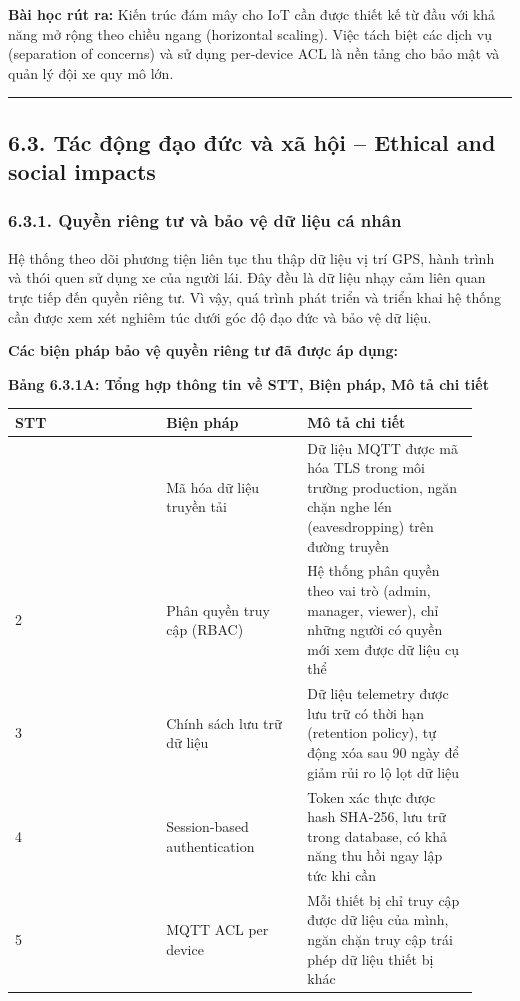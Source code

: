 \documentclass[13pt,a4paper]{extarticle}
\newcounter{none} %
\newcommand{\thesislongtableorignewline}{}
\let\thesislongtableorignewline\\
\renewcommand{\\}{\thesislongtableorignewline\hline}%
\let\\\thesislongtableorignewline
\newcommand{\thesistabletitle}[1]{%
  \begin{center}\textbf{#1}\end{center}%
}
\begin{document}
\textbf{Bài học rút ra:} Kiến trúc đám mây cho IoT cần được thiết kế từ
đầu với khả năng mở rộng theo chiều ngang (horizontal scaling). Việc
tách biệt các dịch vụ (separation of concerns) và sử dụng per-device ACL
là nền tảng cho bảo mật và quản lý đội xe quy mô lớn.

\begin{center}\rule{0.5\linewidth}{0.5pt}\end{center}

\subsection{6.3. Tác động đạo đức và xã hội -- Ethical and social impacts}\label{63-tuxe1c-ux111ux1ed9ng-ux111ux1ea1o-ux111ux1ee9c-vuxe0-xuxe3-hux1ed9i--ethical-and-social-impacts}

\subsubsection{6.3.1. Quyền riêng tư và bảo vệ dữ liệu cá
nhân}\label{631-quyux1ec1n-riuxeang-tux1b0-vuxe0-bux1ea3o-vux1ec7-dux1eef-liux1ec7u-cuxe1-nhuxe2n}

Hệ thống theo dõi phương tiện liên tục thu thập dữ liệu vị trí GPS, hành
trình và thói quen sử dụng xe của người lái. Đây đều là dữ liệu nhạy cảm
liên quan trực tiếp đến quyền riêng tư. Vì vậy, quá trình phát triển và
triển khai hệ thống cần được xem xét nghiêm túc dưới góc độ đạo đức và
bảo vệ dữ liệu.

\textbf{Các biện pháp bảo vệ quyền riêng tư đã được áp dụng:}

{\def\LTcaptype{none} %
\thesistabletitle{Bảng 6.3.1A: Tổng hợp thông tin về STT, Biện pháp, Mô tả chi tiết}

\begin{longtable}{|p{0.30\linewidth}|p{0.28\linewidth}|p{0.34\linewidth}|}
\hline \textbf{STT} & \textbf{Biện pháp} & \textbf{Mô tả chi tiết} \\
\hline
\endhead
\hline
\endlastfoot
1 & Mã hóa dữ liệu truyền tải & Dữ liệu MQTT được mã hóa TLS trong môi
trường production, ngăn chặn nghe lén (eavesdropping) trên đường
truyền \\
2 & Phân quyền truy cập (RBAC) & Hệ thống phân quyền theo vai trò
(admin, manager, viewer), chỉ những người có quyền mới xem được dữ liệu
cụ thể \\
3 & Chính sách lưu trữ dữ liệu & Dữ liệu telemetry được lưu trữ có thời
hạn (retention policy), tự động xóa sau 90 ngày để giảm rủi ro lộ lọt dữ
liệu \\
4 & Session-based authentication & Token xác thực được hash SHA-256, lưu
trữ trong database, có khả năng thu hồi ngay lập tức khi cần \\
5 & MQTT ACL per device & Mỗi thiết bị chỉ truy cập được dữ liệu của
mình, ngăn chặn truy cập trái phép dữ liệu thiết bị khác \\
\end{longtable}
}
\end{document}
